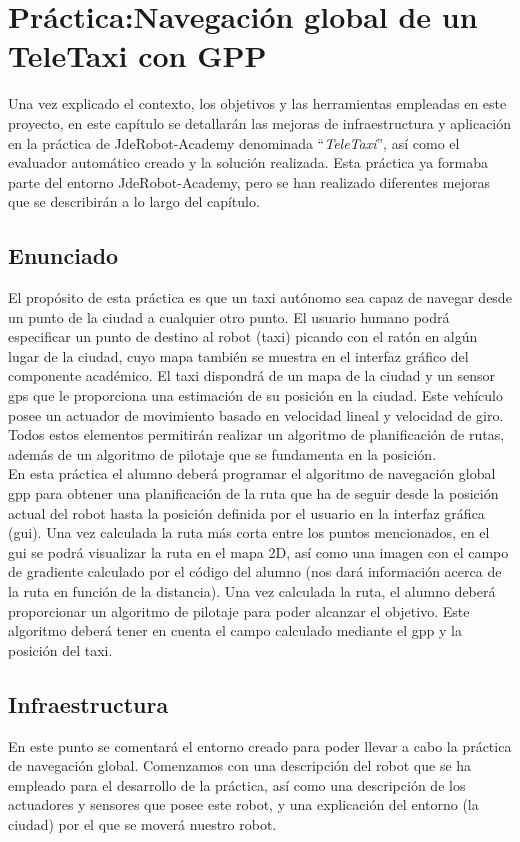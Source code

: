 \chapter{Práctica:Navegación global de un TeleTaxi con GPP}\label{cap.gpp}
 Una vez explicado el contexto, los objetivos y las herramientas empleadas en este proyecto, en este capítulo se detallarán las mejoras de infraestructura y aplicación en la práctica de JdeRobot-Academy denominada ``\textit{TeleTaxi}'', así como el evaluador automático creado y la solución realizada. Esta práctica ya formaba parte del entorno JdeRobot-Academy, pero se han realizado diferentes mejoras que se describirán a lo largo del capítulo.

\section{Enunciado} \label{sec.enunciado}
El propósito de esta práctica es que un taxi autónomo sea capaz de navegar desde un punto de la ciudad a cualquier otro punto. El usuario humano podrá especificar un punto de destino al robot (taxi) picando con el ratón en algún lugar de la ciudad, cuyo mapa también se muestra en el interfaz gráfico del componente académico. El taxi dispondrá de un mapa de la ciudad y un sensor \acrfull{gps} que le proporciona una estimación de su posición en la ciudad. Este vehículo posee un actuador de movimiento basado en velocidad lineal y velocidad de giro. Todos estos elementos permitirán realizar un algoritmo de planificación de rutas, además de un algoritmo de pilotaje que se fundamenta en la posición.\\ 

En esta práctica el alumno deberá programar el algoritmo de navegación global \acrfull{gpp} para obtener una planificación de la ruta que ha de seguir desde la posición actual del robot hasta la posición definida por el usuario en la interfaz gráfica (\acrshort{gui}). Una vez calculada la ruta más corta entre los puntos mencionados, en el \acrshort{gui} se podrá visualizar la ruta en el mapa 2D, así como una imagen con el campo de gradiente calculado por el código del alumno (nos dará información acerca de la ruta en función de la distancia). Una vez calculada la ruta, el alumno deberá proporcionar un algoritmo de pilotaje para poder alcanzar el objetivo. Este algoritmo deberá tener en cuenta el campo calculado mediante el \acrshort{gpp} y la posición del taxi. 

\section{Infraestructura}
En este punto se comentará el entorno creado para poder llevar a cabo la práctica de navegación global. Comenzamos con una descripción del robot que se ha empleado para el desarrollo de la práctica, así como una descripción de los actuadores y sensores que posee este robot, y una explicación del entorno (la ciudad) por el que se moverá nuestro robot.

